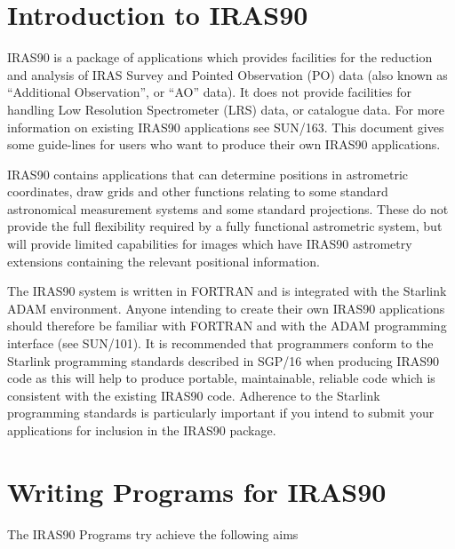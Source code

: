 \setlength{\parskip}{0mm} \tableofcontents
\setlength{\parskip}{\medskipamount} \markright{\stardocname}

\newpage

\section{Introduction to IRAS90}

{\small IRAS90} is a package of applications which provides facilities
for the reduction and analysis of {\small IRAS} Survey and Pointed
Observation (PO) data (also known as ``Additional Observation'', or
``AO'' data). It does not provide facilities for handling Low
Resolution Spectrometer (LRS) data, or catalogue data. For more
information on existing {\small IRAS90} applications see SUN/163.  This
document gives some guide-lines for users who want to produce their own
{\small IRAS90} applications.

{\small IRAS90} contains applications that can determine positions in 
astrometric coordinates, draw grids and other functions relating to some 
standard astronomical measurement systems and some standard projections. These 
do not provide the full flexibility required by a fully functional astrometric
system, but will provide limited capabilities for images which have {\small 
IRAS90} astrometry extensions containing the relevant positional information.

The {\small IRAS90} system is written in {\small FORTRAN} and is
integrated with the Starlink {\small ADAM} environment. Anyone
intending to create their own {\small IRAS90} applications should
therefore be familiar with {\small FORTRAN} and with the {\small ADAM}
programming interface (see SUN/101). It is recommended that programmers
conform to the Starlink programming standards described in SGP/16 when
producing {\small IRAS90} code as this will help to produce portable,
maintainable, reliable code which is consistent with the existing
{\small IRAS90} code. Adherence to the Starlink programming standards
is particularly important if you intend to submit your applications for
inclusion in the {\small IRAS90} package. 

\section{Writing Programs for IRAS90}
The {\small IRAS90} Programs try achieve the following aims


